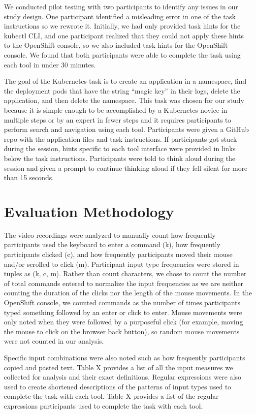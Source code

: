 \documentclass[11pt, oneside]{article}   	%
\begin{document}
We conducted pilot testing with two participants to identify any issues in our study design. One participant identified a misleading error in one of the task instructions so we rewrote it. Initially, we had only provided task hints for the kubectl CLI, and one participant realized that they could not apply these hints to the OpenShift console, so we also included task hints for the OpenShift console. We found that both participants were able to complete the task using each tool in under 30 minutes.

The goal of the Kubernetes task is to create an application in a namespace, find the deployment pods that have the string “magic key” in their logs, delete the application, and then delete the namespace. This task was chosen for our study because it is simple enough to be accomplished by a Kubernetes novice in multiple steps or by an expert in fewer steps and it requires participants to perform search and navigation using each tool. Participants were given a GitHub repo with the application files and task instructions. If participants got stuck during the session, hints specific to each tool interface were provided in links below the task instructions. Participants were told to think aloud during the session and given a prompt to continue thinking aloud if they fell silent for more than 15 seconds.

\section{Evaluation Methodology}
The video recordings were analyzed to manually count how frequently participants used the keyboard to enter a command (k), how frequently participants clicked (c), and how frequently participants moved their mouse and/or scrolled to click (m). Participant input type frequencies were stored in tuples as (k, c, m). Rather than count characters, we chose to count the number of total commands entered to normalize the input frequencies as we are neither counting the duration of the clicks nor the length of the mouse movements. In the OpenShift console, we counted commands as the number of times participants typed something followed by an enter or click to enter. Mouse movements were only noted when they were followed by a purposeful click (for example, moving the mouse to click on the browser back button), so random mouse movements were not counted in our analysis. 

Specific input combinations were also noted such as how frequently participants copied and pasted text. Table X provides a list of all the input measures we collected for analysis and their exact definitions. Regular expressions were also used to create shortened descriptions of the patterns of input types used to complete the task with each tool. Table X provides a list of the regular expressions participants used to complete the task with each tool. 
\end{document}
